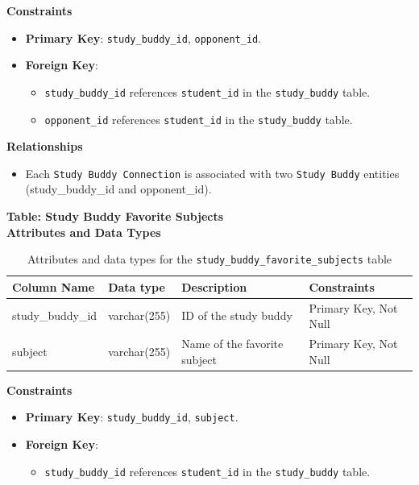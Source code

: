 \documentclass[12pt]{article}
\begin{document}
    \noindent 
    \textbf{Constraints} 
    \begin{itemize} 
        \item \textbf{Primary Key}: \texttt{study\_buddy\_id}, \texttt{opponent\_id}. 
        \item \textbf{Foreign Key}: \begin{itemize} 
            \item \texttt{study\_buddy\_id} references \texttt{student\_id} in the \texttt{study\_buddy} table. 
            \item \texttt{opponent\_id} references \texttt{student\_id} in the \texttt{study\_buddy} table. 
        \end{itemize} 
    \end{itemize}

    \noindent 
    \textbf{Relationships} 
    \begin{itemize} 
        \item Each \texttt{Study Buddy Connection} is associated with two \texttt{Study Buddy} entities (study\_buddy\_id and opponent\_id). 
    \end{itemize}

    \pagebreak

    \textbf{Table: Study Buddy Favorite Subjects} \\

    \textbf{Attributes and Data Types}
    \begin{table}[H] 
        \centering 
        \renewcommand{\arraystretch}{1.5} 
        \begin{tabular}{|l|l|p{4.5cm}|l|} 
        \hline 
        \rowcolor[HTML]{96FFFB} 
        \textbf{Column Name} & \textbf{Data type} & \textbf{Description} & \textbf{Constraints} \\ \hline 
        study\_buddy\_id & varchar(255) & ID of the study buddy & Primary Key, Not Null \\ \hline 
        subject & varchar(255) & Name of the favorite subject & Primary Key, Not Null \\ \hline 
        \end{tabular} 
        \caption{Attributes and data types for the \texttt{study\_buddy\_favorite\_subjects} table} 
    \end{table}

    \noindent 
    \textbf{Constraints} 
    \begin{itemize} 
        \item \textbf{Primary Key}: \texttt{study\_buddy\_id}, \texttt{subject}. 
        \item \textbf{Foreign Key}: \begin{itemize} \item \texttt{study\_buddy\_id} references \texttt{student\_id} in the \texttt{study\_buddy} table. 
        \end{itemize} 
    \end{itemize}
\end{document}
